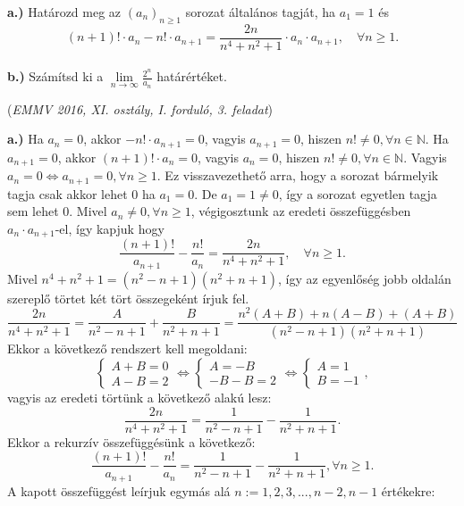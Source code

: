 \begin{extraproblem}
\textbf{a.)} Határozd meg az $(a_{n})_{n\geq1}$ sorozat általános
tagját, ha $a_{1}=1$ és 
\[
(n+1)!\cdot a_{n}-n!\cdot a_{n+1}=\frac{2n}{n^{4}+n^{2}+1}\cdot a_{n}\cdot a_{n+1},\quad\forall n\geq1.
\]
\\
 \textbf{b.)} Számítsd ki a $\lim\limits_{n\to\infty}\frac{2^{n}}{a_{n}}$
határértéket. 
\begin{flushright}
(\textit{EMMV 2016, XI. osztály, I. forduló, 3. feladat}) 
\par\end{flushright}
\end{extraproblem}

\begin{solution}
\textbf{a.)} Ha $a_{n}=0$, akkor $-n!\cdot a_{n+1}=0$, vagyis $a_{n+1}=0$,
hiszen $n!\neq0,\forall n\in\mathbb{N}$. Ha $a_{n+1}=0$, akkor $(n+1)!\cdot a_{n}=0$,
vagyis $a_{n}=0$, hiszen $n!\neq0,\forall n\in\mathbb{N}$. Vagyis
$a_{n}=0\iff a_{n+1}=0,\forall n\geq1$. Ez visszavezethető arra,
hogy a sorozat bármelyik tagja csak akkor lehet 0 ha $a_{1}=0$. De
$a_{1}=1\neq0$, így a sorozat egyetlen tagja sem lehet 0. Mivel $a_{n}\neq0,\forall n\geq1$,
végigosztunk az eredeti összefüggésben $a_{n}\cdot a_{n+1}$-el, így
kapjuk hogy 
\[
\frac{(n+1)!}{a_{n+1}}-\frac{n!}{a_{n}}=\frac{2n}{n^{4}+n^{2}+1},\quad\forall n\geq1.
\]
Mivel $n^{4}+n^{2}+1=(n^{2}-n+1)(n^{2}+n+1)$, így az egyenlőség jobb
oldalán szereplő törtet két tört összegeként írjuk fel. 
\[
\frac{2n}{n^{4}+n^{2}+1}=\frac{A}{n^{2}-n+1}+\frac{B}{n^{2}+n+1}=\frac{n^{2}(A+B)+n(A-B)+(A+B)}{(n^{2}-n+1)(n^{2}+n+1)}
\]
Ekkor a következő rendszert kell megoldani: 
\[
\begin{cases}
A+B=0\\
A-B=2
\end{cases}\iff\begin{cases}
A=-B\\
-B-B=2
\end{cases}\iff\begin{cases}
A=1\\
B=-1
\end{cases},
\]
vagyis az eredeti törtünk a következő alakú lesz: 
\[
\frac{2n}{n^{4}+n^{2}+1}=\frac{1}{n^{2}-n+1}-\frac{1}{n^{2}+n+1}.
\]
Ekkor a rekurzív összefüggésünk a következő: 
\[
\frac{(n+1)!}{a_{n+1}}-\frac{n!}{a_{n}}=\frac{1}{n^{2}-n+1}-\frac{1}{n^{2}+n+1},\forall n\geq1.
\]
A kapott összefüggést leírjuk egymás alá $n:=1,2,3,...,n-2,n-1$ értékekre:
\begin{align*}

\end{align*}
\end{solution}
